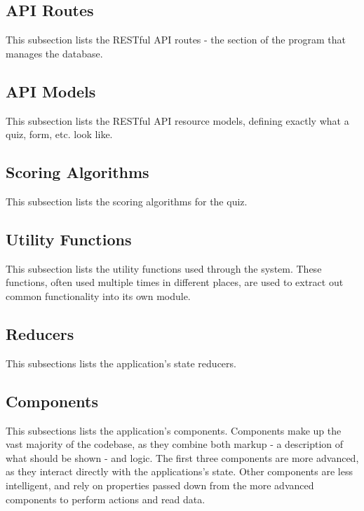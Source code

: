 \subsection{API Routes} %
\label{sub:api_routes}
This subsection lists the RESTful API routes - the section of the program that manages the database.


\subsection{API Models} %
\label{sub:api_models}
This subsection lists the RESTful API resource models, defining exactly what a quiz, form, etc. look like.


\subsection{Scoring Algorithms} %
\label{sub:api_models}
This subsection lists the scoring algorithms for the quiz.


\subsection{Utility Functions} %
\label{sub:utility_functions}
This subsection lists the utility functions used through the system. These functions, often used multiple times in different places, are used to extract out common functionality into its own module.


\subsection{Reducers} %
\label{sub:reducers}
This subsections lists the application's state reducers.


\subsection{Components} %
\label{sub:reducers}
This subsections lists the application's components. Components make up the vast majority of the codebase, as they combine both markup - a description of what should be shown - and logic. The first three components are more advanced, as they interact directly with the applications's state. Other components are less intelligent, and rely on properties passed down from the more advanced components to perform actions and read data.


